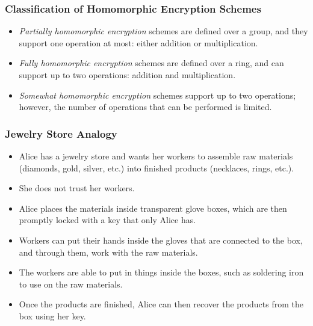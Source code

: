 \documentclass{beamer}
\begin{document}
\begin{frame}
\frametitle{Classification of Homomorphic Encryption Schemes}
\begin{itemize}
\item \emph{Partially homomorphic encryption} schemes are defined over a group, and they support one operation at most: either addition or multiplication.  
\item \emph{Fully homomorphic encryption} schemes are defined over a ring, and can support up to two operations: addition and multiplication. 
\item \emph{Somewhat homomorphic encryption} schemes support up to two operations; however, the number of operations that can be performed is limited.
\end{itemize}

\end{frame}
\begin{frame}
\frametitle{Jewelry Store Analogy}

\begin{itemize}
\item Alice has a jewelry store and wants her workers to assemble raw materials (diamonds, gold, silver, etc.) into finished products (necklaces, rings, etc.).
\item She does not trust her workers.
\item Alice places the materials inside transparent glove boxes, which are then promptly locked with a key that only Alice has. 
\item Workers can put their hands inside the gloves that are connected to the box, and through them, work with the raw materials. 
\item The workers are able to put in things inside the boxes, such as soldering iron to use on the raw materials.
\item Once the products are finished, Alice can then recover the products from the box using her key. 
\end{itemize}

\end{frame}
\end{document}
